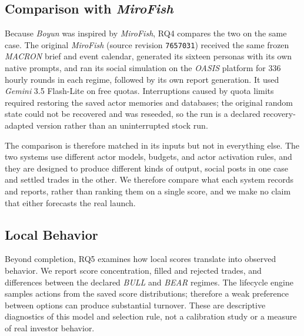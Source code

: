 \subsection{Comparison with \textit{MiroFish}}\label{sec:eval-mirofish}
Because \textit{Boyun} was inspired by \textit{MiroFish}, RQ4 compares the two
on the same case. The original \textit{MiroFish} (source revision
\texttt{7657031}) \cite{mirofish} received the same frozen \textit{MACRON}
brief and event calendar, generated its sixteen personas with its own native
prompts, and ran its social simulation on the \textit{OASIS} platform
\cite{yang2025} for 336 hourly rounds in each regime, followed by its own
report generation. It used \textit{Gemini} 3.5 Flash-Lite on free quotas.
Interruptions caused by quota limits required restoring the saved actor
memories and databases; the original random state could not be recovered and
was reseeded, so the run is a declared recovery-adapted version rather than
an uninterrupted stock run.

The comparison is therefore matched in its inputs but not in everything else.
The two systems use different actor models, budgets, and actor activation
rules, and they are designed to produce different kinds of output, social
posts  in one case and settled trades  in the other. We therefore compare what
each system records and reports, rather than ranking them on a single score,
and we make no claim that either forecasts the real launch.

\subsection{Local  Behavior}\label{sec:eval-laya}
Beyond completion, RQ5 examines how local  scores translate into
observed  behavior. We report score concentration, filled and rejected trades,
 and differences between the declared \textit{BULL} and \textit{BEAR} regimes.
The lifecycle engine samples actions from the saved score distributions;
therefore a weak preference between options can produce substantial turnover.
These are descriptive diagnostics of this model and selection rule, not a
calibration study or a measure of real investor behavior.

